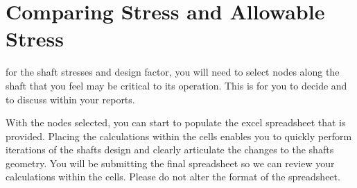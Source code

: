 \section{Comparing Stress and Allowable Stress}

 for the shaft stresses and design factor, you will need to select nodes along the shaft that you feel may be critical to its operation. This is for you to decide and to discuss within your reports.

With the nodes selected, you can start to populate the excel spreadsheet that is provided. Placing the calculations within the cells enables you to quickly perform iterations of the shafts design and clearly articulate the changes to the shafts geometry. You will be submitting the final spreadsheet so we can review your calculations within the cells. Please do not alter the format of the spreadsheet. 

